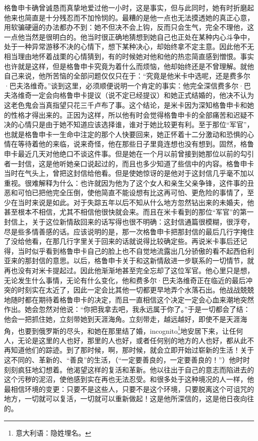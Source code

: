 \par 格鲁申卡确曾诚恳而真挚地爱过他一小时，这是事实，但与此同时，她有时折磨起他来也简直是十分残忍而不加怜悯的。最糟的是他一点也无法摸透她的真正心意，用软骗硬逼的办法都办不到：她不但决不会上钩，反而只会生气，完全不理他，这一点他当然是很明白的。他当时很正确地猜想到她自己也正处在某种内心斗争中，处于一种异常游移不决的心情下，想下某种决心，却始终拿不定主意。因此他不无相当理由地怀着战栗的心情猜到，有的时候她对他和他的热恋简直感到憎恨。事实也许就是这样，但是格鲁申卡究竟为着什么而烦恼，他却始终还是不曾理解。就他自己来说，他所苦恼的全部问题仅仅只在于：“究竟是他米卡中选呢，还是费多尔·巴夫洛维奇。”谈到这里，必须顺便说明一个肯定的事实：他完全深信费多尔·巴夫洛维奇一定会向格鲁申卡提议（说不定已经提议）和她正式结婚的，他决不认为这老色鬼会当真指望只花三千卢布了事。这个结论，是米卡因为深知格鲁申卡和她的性格才得出来的。正因为这样，所以他有时会觉得格鲁申卡的全部痛苦和迟疑不决的心情只是由于她不知道应该选择谁，谁对于她比较更有利。至于那位“军官”，也就是格鲁申卡一生命中注定的那个人快要回来，她正怀着十二分激动和恐惧的心情在等待着他的来临，说来奇怪，他在那些日子里竟连想也没有想到。固然，格鲁申卡最近几天对他绝口不谈这件事。但是她在一个月以前曾接到她那位以前的勾引者一封信，这是他听她亲口说起过的，而且也多少知道了些信中的内容。格鲁申卡当时在气头上，曾把这封信给他看。但是使她惊讶的是他对于这封信几乎毫不加以重视。很难解释为什么：也许就因为他为了这个女人和亲生父亲争锋，这件事的丑恶和可怕已把他完全压倒，使他简直不能设想有比这再可怕、更危险的事情了，至少在当时来说是如此。对于失踪五年以后不知从什么地方忽然钻出来的未婚夫，他甚至根本不相信，尤其不相信他很快就会来。而且在米卡看到的那位“军官”的第一封信上，关于这位新情敌回来的话写得也很不明确：这封信通篇很模糊，很浮夸，尽是些多情善感的话。应该说明的是，那一次格鲁申卡把那封信的最后几行字掩住了没给他看，在那几行字里关于回来的话就说得比较确定些。再说米卡事后还记得，当时似乎看到格鲁申卡自己的脸上也不自觉地流露出几分骄傲的看不起西伯利亚来的那封信的意思。以后，格鲁申卡关于和这新情敌进一步联系的一切情节，就再也没有对米卡提起过。因此他渐渐地甚至完全忘却了这位军官。他心里只是想，无论发生什么事情，无论有什么变化，他和费多尔·巴夫洛维奇正在临近的最后冲突的时刻实在太近了，因此一定会比其他一切都更早地弄个水落石出。他战战兢兢地随时都在期待着格鲁申卡的决定，而且一直相信这个决定一定会心血来潮地突然作出。她会忽然对他说：“你把我拿去吧，我永远属于你了。”于是一切都会了结：他会一把抓住她，立刻带她到天涯海角。立刻带走，越远越好，即使不是天涯海角，也要到俄罗斯的尽头，和她在那里结了婚，incognito\footnote{意大利语：隐姓埋名。}地安居下来，让任何人，无论是这里的人也好，那里的人也好，或者任何别的地方的人也好，都从此不再知道他们的踪迹。到了那时候，啊，那时候，就会立即开始过崭新的生活！关于这不同的、革新的、“善良”的生活，（“一定要善良的，一定要善良的！”）他时时刻刻疯狂地幻想着。他渴望这样的复活和革新。他以往出于自己的意志而陷进去的这个污秽的泥沼，使他感到实在再也无法忍受。和很多处于这种境况的人一样，他最相信环境的变更：只要不是这些人，只要不是这个环境，只要脱离这个可诅咒的地方，一切就可以复活，一切就可以重新做起！这是他所深信的，这是他日夜向往的。
